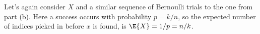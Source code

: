 Let's again consider $X$ and a similar sequence of Bernoulli trials to the one from part (b).
Here a success occurs with probability $p=k/n$, so the expected number of indices picked in  before $x$ is found, is $\E{X}=1/p=n/k$.
